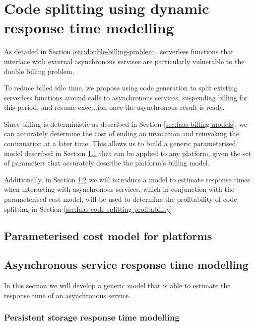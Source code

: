 \chapter{Code splitting using dynamic response time modelling}

As detailed in Section \ref{sec:double-billing-problem}, serverless functions that interface with external asynchronous services are particularly vulnerable to the double billing problem.

To reduce billed idle time, we propose using code generation to split existing serverless functions around calls to asynchronous services, suspending billing for this period, and resume execution once the asynchronous result is ready.

Since \faaas{} billing is deterministic as described in Section \ref{sec:faas-billing-models}, we can accurately determine the cost of ending an invocation and reinvoking the continuation at a later time. This allows us to build a generic parameterised model described in Section \ref{sec:faas-param-cost-model} that can be applied to any \faas{} platform, given the set of parameters that accurately describe the platform's billing model.

Additionally, in Section \ref{sec:faas-async-service-response-time-modelling} we will introduce a model to estimate response times when interacting with asynchronous services, which in conjunction with the parameterised cost model, will be used to determine the profitability of code splitting in Section \ref{sec:faas-code-splitting-profitability}.

\section{Parameterised cost model for \faas{} platforms}
\label{sec:faas-param-cost-model}

\section{Asynchronous service response time modelling}
\label{sec:faas-async-service-response-time-modelling}
In this section we will develop a generic model that is able to estimate the response time of an asynchronous service.

\subsection{Persistent storage response time modelling}


